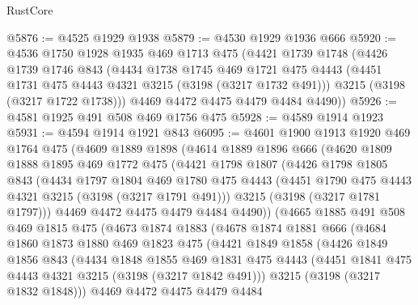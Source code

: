 \begin{lexlean}{RustCore}
\begin{coremodule}
@5876 := @4525 @1929 @1938
@5879 := @4530 @1929 @1936 @666
@5920 := @4536
    @1750
    @1928
    @1935
    @469
    @1713
    @475
    (@4421
      @1739
      @1748
      (@4426
        @1739
        @1746
        @843
        (@4434
          @1738
          @1745
          @469
          @1721
          @475
          @4443
          (@4451 @1731 @475 @4443 @4321 @3215 (@3198 (@3217 @1732 @491)))
          @3215
          (@3198 (@3217 @1722 @1738)))
        @4469
        @4472
        @4475
        @4479
        @4484
        @4490))
@5926 := @4581 @1925 @491 @508 @469 @1756 @475
@5928 := @4589 @1914 @1923
@5931 := @4594 @1914 @1921 @843
@6095 := @4601
    @1900
    @1913
    @1920
    @469
    @1764
    @475
    (@4609
      @1889
      @1898
      (@4614
        @1889
        @1896
        @666
        (@4620
          @1809
          @1888
          @1895
          @469
          @1772
          @475
          (@4421
            @1798
            @1807
            (@4426
              @1798
              @1805
              @843
              (@4434
                @1797
                @1804
                @469
                @1780
                @475
                @4443
                (@4451 @1790 @475 @4443 @4321 @3215 (@3198 (@3217 @1791 @491)))
                @3215
                (@3198 (@3217 @1781 @1797)))
              @4469
              @4472
              @4475
              @4479
              @4484
              @4490))
          (@4665
            @1885
            @491
            @508
            @469
            @1815
            @475
            (@4673
              @1874
              @1883
              (@4678
                @1874
                @1881
                @666
                (@4684
                  @1860
                  @1873
                  @1880
                  @469
                  @1823
                  @475
                  (@4421
                    @1849
                    @1858
                    (@4426
                      @1849
                      @1856
                      @843
                      (@4434
                        @1848
                        @1855
                        @469
                        @1831
                        @475
                        @4443
                        (@4451 @1841 @475 @4443 @4321 @3215 (@3198 (@3217 @1842 @491)))
                        @3215
                        (@3198 (@3217 @1832 @1848)))
                      @4469
                      @4472
                      @4475
                      @4479
                      @4484

\end{coremodule}
\end{lexlean}
